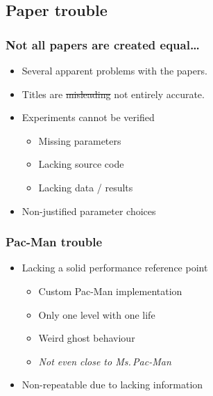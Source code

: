 \documentclass{beamer}
\begin{document}
\subsection{Paper trouble}
\begin{frame}
\frametitle{Not all papers are created equal\dots}
\begin{itemize}
\item Several apparent problems with the papers.
\item Titles are \sout{misleading} not entirely accurate.
\item Experiments cannot be verified
\begin{itemize}
\item Missing parameters
\item Lacking source code
\item Lacking data / results
\end{itemize}
\item Non-justified parameter choices
\end{itemize}
\end{frame}

\begin{frame}
\frametitle{Pac-Man trouble}
\begin{itemize}
\item Lacking a solid performance reference point
\begin{itemize}
\item Custom Pac-Man implementation
\item Only one level with one life
\item Weird ghost behaviour
\item \textit{Not even close to Ms.\,Pac-Man}
\end{itemize}
\item Non-repeatable due to lacking information
\end{itemize}
\end{frame}
\end{document}
